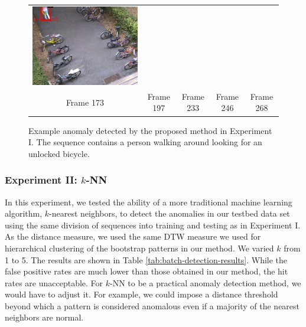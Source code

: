 \begin{figure}[t]
\begin{tabular}{ccccc}
    \includegraphics[scale=0.24]{figures/case-3-suspicious-0268} \\
    \small Frame 173 & 
    \small Frame 197 & 
    \small Frame 233 & 
    \small Frame 246 & 
    \small Frame 268
  \end{tabular}
  \caption[Example anomaly detected by the proposed method in
    Experiment I.]{\small Example anomaly detected by the proposed
    method in Experiment I.  The sequence contains a person walking
    around looking for an unlocked bicycle.}
  \label{fig:batch-suspicious-behavior-detected}
\end{figure}

\subsubsection{Experiment II: $k$-NN}

In this experiment, we tested the ability of a more traditional
machine learning algorithm, $k$-nearest neighbors, to detect the
anomalies in our testbed data set using the same division of sequences
into training and testing as in Experiment I.  As the distance
measure, we used the same DTW measure we used for hierarchical
clustering of the bootstrap patterns in our method.  We varied $k$
from 1 to 5.  The results are shown in
Table \ref{tab:batch-detection-results}. While the false positive rates are much
lower than those obtained in our method, the hit rates are
unacceptable.  For $k$-NN to be a practical anomaly detection method,
we would have to adjust it.  For example, we could impose a distance
threshold beyond which a pattern is considered anomalous even if a
majority of the nearest neighbors are normal.

